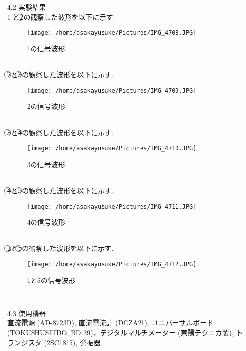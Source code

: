 \documentclass[uplatex,a4paper,11pt,dvipdfmxs]{jsarticle}
\begin{document}
\begin{enumerate}
\begin{enumerate}
        \item[4.2] 実験結果\\
        \textcircled{\scriptsize 1}と\textcircled{\scriptsize 2}の観察した波形を以下に示す. 
        \begin{figure}[H]
            \centering
            \texttt{[image: /home/asakayusuke/Pictures/IMG\_4708.JPG]}
            \caption{1の信号波形}
            \label{figure:g1}
        \end{figure}
        \\
        \textcircled{\scriptsize 2}と\textcircled{\scriptsize 3}の観察した波形を以下に示す.
        \begin{figure}[H]
            \centering
            \texttt{[image: /home/asakayusuke/Pictures/IMG\_4709.JPG]}
            \caption{2の信号波形}
            \label{figure:g2}
        \end{figure}
        \\
        \textcircled{\scriptsize 3}と\textcircled{\scriptsize 4}の観察した波形を以下に示す.
        \begin{figure}[H]
            \centering
            \texttt{[image: /home/asakayusuke/Pictures/IMG\_4710.JPG]}
            \caption{3の信号波形}
            \label{figure:g3}
        \end{figure}
        \\
        \textcircled{\scriptsize 4}と\textcircled{\scriptsize 5}の観察した波形を以下に示す.
        \begin{figure}[H]
            \centering
            \texttt{[image: /home/asakayusuke/Pictures/IMG\_4711.JPG]}
            \caption{4の信号波形}
            \label{figure:g4}
        \end{figure}
        \\
        \textcircled{\scriptsize 1}と\textcircled{\scriptsize 5}の観察した波形を以下に示す.
        \begin{figure}[H]
            \centering
            \texttt{[image: /home/asakayusuke/Pictures/IMG\_4712.JPG]}
            \caption{1と5の信号波形}
            \label{figure:g15}
        \end{figure}
        \\
        \item[4.3] 使用機器\\
        直流電源 (AD-8723D), 直流電流計 (DCZA21), ユニバーサルボード (TOKUSHUSEIDO, BD 39)，デジタルマルチメーター (東陽テクニカ製), 
        トランジスタ (2SC1815), 発振器\\


\end{enumerate}
\end{enumerate}
\end{document}
